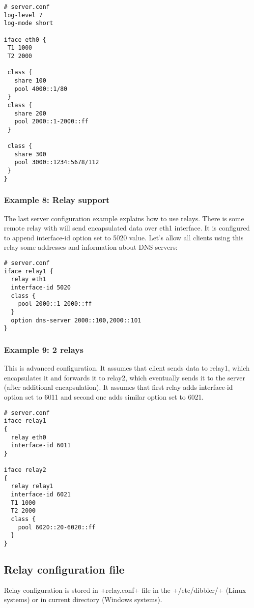 \begin{verbatim}
# server.conf
log-level 7
log-mode short

iface eth0 {
 T1 1000
 T2 2000

 class {
   share 100
   pool 4000::1/80
 }
 class {
   share 200
   pool 2000::1-2000::ff
 }

 class {
   share 300
   pool 3000::1234:5678/112
 }
}
\end{verbatim}

\subsubsection{Example 8: Relay support}

The last server configuration example explains how to use
relays. There is some remote relay with will send encapsulated data over
eth1 interface. It is configured to append interface-id option set to
5020 value. Let's allow all clients using this relay some addresses
and information about DNS servers:

\begin{verbatim}
# server.conf
iface relay1 {
  relay eth1
  interface-id 5020
  class {
    pool 2000::1-2000::ff
  }
  option dns-server 2000::100,2000::101
}
\end{verbatim}

\subsubsection{Example 9: 2 relays}
This is advanced configuration. It assumes that client sends data to
relay1, which encapsulates it and forwards it to relay2, which
eventually sends it to the server (after additional encapsulation). It
assumes that first relay adds interface-id option set to 6011 and
second one adds similar option set to 6021. 

\begin{verbatim}
# server.conf
iface relay1
{
  relay eth0
  interface-id 6011
} 

iface relay2
{
  relay relay1
  interface-id 6021
  T1 1000
  T2 2000
  class {
    pool 6020::20-6020::ff
  }
}
\end{verbatim}

\subsection{Relay configuration file}

Relay configuration is stored in +relay.conf+ file in the +/etc/dibbler/+
(Linux systems) or in current directory (Windows systems).

